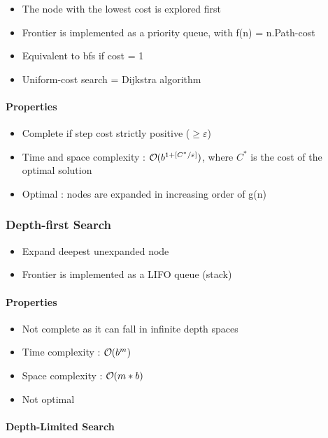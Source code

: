 \begin{itemize}
\item The node with the lowest cost is explored first
\item Frontier is implemented as a priority queue, with f(n) = n.Path-cost
\item Equivalent to bfs if cost = 1
\item Uniform-cost search = Dijkstra algorithm
\end{itemize}

\paragraph{Properties}
\begin{itemize}
\item Complete if step cost strictly positive ($\geq \varepsilon$)
\item Time and space complexity : $\bigO (b^{1+[C^* / \varepsilon]})$, where $C^*$ is the cost of the optimal solution
\item Optimal : nodes are expanded in increasing order of g(n)
\end{itemize}

\subsubsection{Depth-first Search}

\begin{itemize}
\item Expand deepest unexpanded node
\item Frontier is implemented as a LIFO queue (stack)
\end{itemize}

\paragraph{Properties}
\begin{itemize}
\item Not complete as it can fall in infinite depth spaces
\item Time complexity : $\bigO (b^m)$
\item Space complexity : $\bigO (m*b)$
\item Not optimal
\end{itemize}

\paragraph{Depth-Limited Search}


